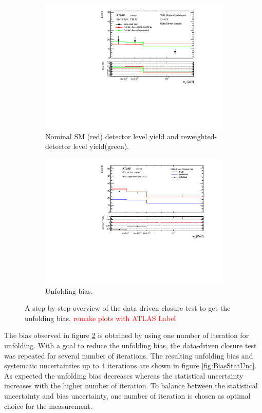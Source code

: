 \begin{figure}[htb]
\begin{subfigure}{.48\textwidth}
        \includegraphics[width=.9\linewidth]{figures/Analysis/Unfolding/DDClosure_VBS_Suppressed_Reweighted.pdf}
        \caption{ Nominal SM (red) detector level yield and reweighted-detector level yield(green). \label{fig:ddclosure_DataMCReweighted} }
    \end{subfigure}
    \begin{subfigure}{.48\textwidth}
        \centering
        \includegraphics[width=.9\linewidth]{figures/Analysis/Unfolding/DDClosure_VBS_Suppressed_Bias.pdf}
        \caption{Unfolding bias. \label{fig:ddclosure_FinalBias} }
    \end{subfigure}
    \caption{ A step-by-step overview of the data driven closure test to get the unfolding bias.  \textcolor{red}{remake plots with ATLAS Label} \label{fig:unfolding_ddclosure}}
\end{figure}

The bias observed in figure \ref{fig:ddclosure_FinalBias} is obtained by using one number of iteration for unfolding. With a goal to reduce the unfolding bias, the data-driven closure test was repeated for several number of iterations. The resulting unfolding bias and systematic uncertainties up to $4$ iterations are shown in figure \ref{fig:BiasStatUnc}. As expected the unfolding bias decreases whereas the statistical uncertainty increases with the higher number of iteration. To balance between the statistical uncertainty and bias uncertainty, one number of iteration is chosen as optimal choice for the measurement.

